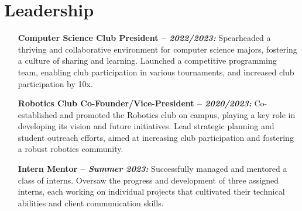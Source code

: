\documentclass[10pt]{article}
\begin{document}
\section{Leadership}
\begin{enumerate}[itemsep=0pt]
  \item [\textbf{Computer Science Club President -- \textit{2022/2023:}}] Spearheaded a thriving and collaborative environment for computer science majors, fostering a culture of sharing and learning. Launched a competitive programming team, enabling club participation in various tournaments, and increased club participation by 10x.
  \item [\textbf{Robotics Club Co-Founder/Vice-President -- \textit{2020/2023:}}] Co-established and promoted the Robotics club on campus, playing a key role in developing its vision and future initiatives. Lead strategic planning and student outreach efforts, aimed at increasing club participation and fostering a robust robotics community.
\item [\textbf{Intern Mentor -- \textit{Summer 2023:}}] Successfully managed and mentored a class of interns. Oversaw the progress and development of three assigned interns, each working on individual projects that cultivated their technical abilities and client communication skills.
\end{enumerate}
\end{document}
